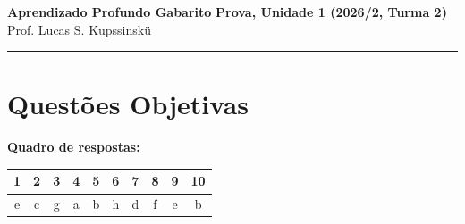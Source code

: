 \documentclass[11pt,a4paper]{article}
\begin{document}
{\Large\bfseries Aprendizado Profundo \textemdash{} Gabarito} \hfill \textbf{Prova, Unidade 1 (2026/2, Turma 2)}\\
Prof. Lucas S. Kupssinskü

\rule{\linewidth}{0.8pt}

\section*{Questões Objetivas}

\textbf{Quadro de respostas:}
\begin{center}
\begin{tabular}{|c|c|c|c|c|c|c|c|c|c|}
\hline
1 & 2 & 3 & 4 & 5 & 6 & 7 & 8 & 9 & 10 \\\hline
e & c & g & a & b & h & d & f & e & b \\\hline
\end{tabular}
\end{center}

\color{blue}
\end{document}
